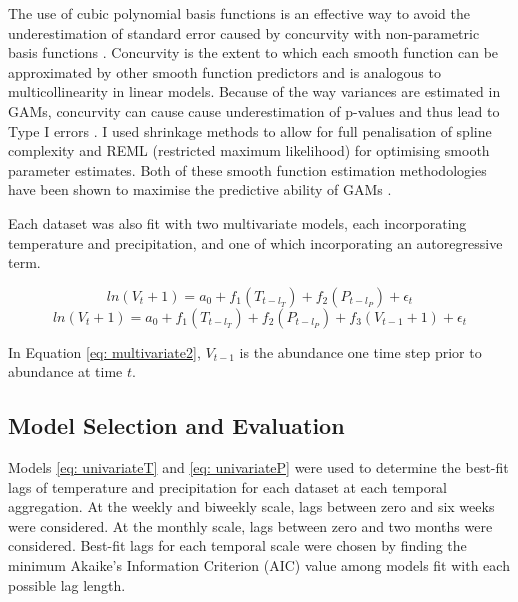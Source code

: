 The use of cubic polynomial basis functions is an effective way to avoid the underestimation of standard error caused by concurvity with non-parametric basis functions \citep{Dominici2002, Ramsay2003}. Concurvity is the extent to which each smooth function can be approximated by other smooth function predictors and is analogous to multicollinearity in linear models. Because of the way variances are estimated in GAMs, concurvity can cause cause underestimation of p-values and thus lead to Type I errors \citep{Ramsay2003}. I used shrinkage methods to allow for full penalisation of spline complexity and REML (restricted maximum likelihood) for optimising smooth parameter estimates. Both of these smooth function estimation methodologies have been shown to maximise the predictive ability of GAMs \citep{Marra2011}. 

Each dataset was also fit with two multivariate models, each incorporating temperature and precipitation, and one of which incorporating an autoregressive term.

\begin{equation}
	ln(V_t + 1) = a_0 + f_1(T_{t-l_T}) + f_2(P_{t-l_P}) + \epsilon_t
	\label{eq: multivariate1}
\end{equation}
\begin{equation}
	ln(V_t + 1) = a_0 + f_1(T_{t-l_T}) + f_2(P_{t-l_P}) + f_3(V_{t-1} + 1) + \epsilon_t
	\label{eq: multivariate2}
\end{equation}

In Equation \ref{eq: multivariate2}, $V_{t-1}$ is the abundance one time step prior to abundance at time $t$. 


\subsection{Model Selection and Evaluation}

Models \ref{eq: univariateT} and \ref{eq: univariateP} were used to determine the best-fit lags of temperature and precipitation for each dataset at each temporal aggregation. At the weekly and biweekly scale, lags between zero and six weeks were considered. At the monthly scale, lags between zero and two months were considered. Best-fit lags for each temporal scale were chosen by finding the minimum Akaike's Information Criterion (AIC) value among models fit with each possible lag length. 

